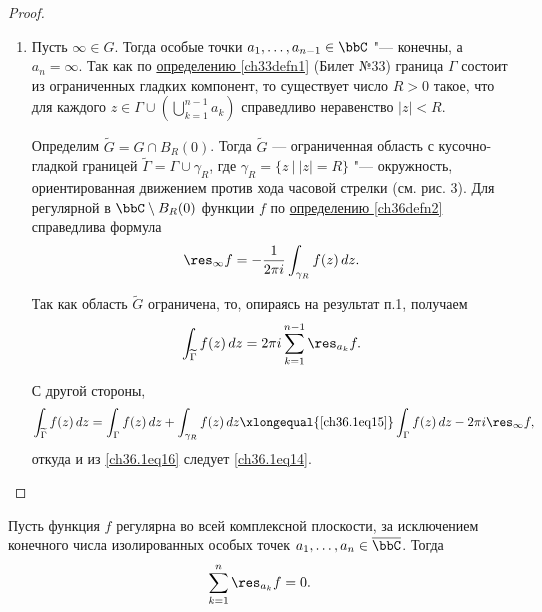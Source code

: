 \begin{leftbar}
\begin{proof}
\begin{enumerate}
\item	Пусть $\infty \in G$. Тогда особые точки $a_1,\ldots,a_{n - 1} \in \bbC$ "--- конечны, а $a_n = \infty$. Так как по \hyperref[ch33defn1]{определению \ref{ch33defn1}} (Билет №33) граница $\Gamma$ состоит из ограниченных гладких компонент, то существует число $R > 0$ такое, что для каждого $z \in \Gamma \cup \left( \bigcup\limits_{k = 1}^{n - 1} a_k \right)$ справедливо неравенство $|z| < R$.

Определим $\widetilde{G} = G \cap B_R(0)$. Тогда $\widetilde G$ — ограниченная область с кусочно-гладкой границей $\widetilde{\Gamma} = \Gamma \cup \gamma_R$, где $\gamma_R = \{ z \: \big| \: |z| = R\}$ "--- окружность, ориентированная движением против хода часовой стрелки (см. рис. 3). Для регулярной в $\bbC \setminus B_R(0)$ функции $f$ по \hyperref[ch36defn2]{определению \ref{ch36defn2}} справедлива формула
\begin{equation} \label{ch36.1eq15}
\res_{\infty} f = - \frac{1}{2\pi i} \int_{\gamma_R} f(z) \,dz.
\end{equation}

Так как область $\widetilde{G}$ ограничена, то, опираясь на результат п.1, получаем
\begin{equation} \label{ch36.1eq16}
\int_{\widetilde{\Gamma}} f(z) \,dz = 2\pi i \sum_{k = 1}^{n - 1} \res_{a_k} f.
\end{equation}
 
С другой стороны,
$$
\int_{\widetilde{\Gamma}} f(z) \,dz = \int_{\Gamma} f(z) \,dz + \int_{\gamma_R} f(z) \,dz \xlongequal{\eqref{ch36.1eq15}} \int_{\Gamma} f(z) \,dz - 2\pi i\res_{\infty} f,
$$
откуда и из \eqref{ch36.1eq16} следует \eqref{ch36.1eq14}.	
\end{enumerate}
\end{proof}
\end{leftbar}

\begin{cons}
Пусть функция $f$ регулярна во всей комплексной плоскости, за исключением конечного числа изолированных особых точек $a_1,\ldots,a_n \in \overline{\bbC}$. Тогда
\begin{equation} \label{ch36.1eq17}
\sum_{k = 1}^{n} \res_{a_k} f = 0.
\end{equation}
\end{cons}

